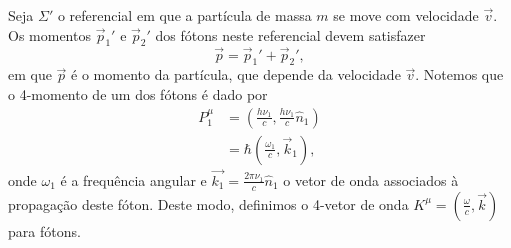 \documentclass[12pt,a4paper]{article}
\numberwithin{equation}{section}
\begin{document}
Seja \(\Sigma'\) o referencial em que a partícula de massa \(m\) se move com velocidade \(\vec{v}\). Os momentos \(\vec{p}_1'\) e \(\vec{p}_2'\) dos fótons neste referencial devem satisfazer
\begin{equation*}
    \vec{p} = \vec{p}_1' + \vec{p}_2',
\end{equation*}
em que \(\vec{p}\) é o momento da partícula, que depende da velocidade \(\vec{v}\). Notemos que  o 4-momento de um dos fótons é dado por
\begin{align*}
    P_1^\mu &= \left(\frac{h \nu_1}{c}, \frac{h\nu_1}{c}\hat{n}_1\right)\\
            &= \hbar \left(\frac{\omega_1}{c}, \vec{k}_1\right),
\end{align*}
onde \(\omega_1\) é a frequência angular e \(\vec{k_1} = \frac{2\pi \nu_1}{c}\hat{n}_1\) o vetor de onda associados à propagação deste fóton. Deste modo, definimos o 4-vetor de onda \(K^\mu = \left(\frac{\omega}{c}, \vec{k}\right)\) para fótons.
\end{document}

